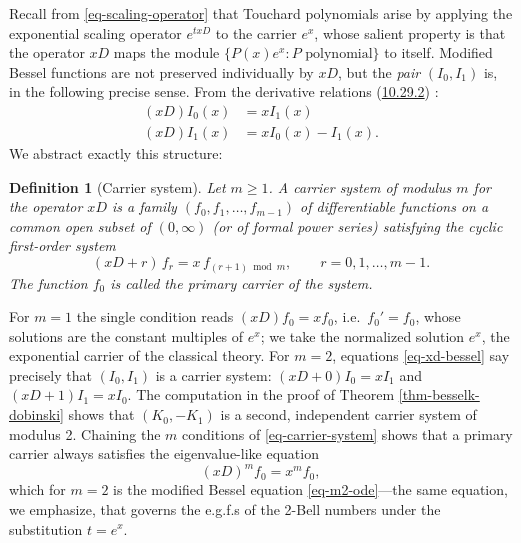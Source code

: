 \documentclass[a4paper]{amsart}
\numberwithin{equation}{section}
\newtheorem{definition}[theorem]{Definition}
\begin{document}
Recall from \eqref{eq-scaling-operator} that Touchard polynomials arise by applying the exponential scaling operator $e^{txD}$ to the carrier $e^x$, whose salient property is that the operator $xD$ maps the module $\{P(x)e^x : P \text{ polynomial}\}$ to itself. Modified Bessel functions are not preserved individually by $xD$, but the \emph{pair} $(I_0, I_1)$ is, in the following precise sense. From the derivative relations (\href{https://dlmf.nist.gov/10.29.E2}{10.29.2}) \cite{NIST:DLMF}:
\begin{equation}\label{eq-xd-bessel}
    \begin{aligned}
        (xD)I_0(x) &= x I_1(x) \\
        (xD)I_1(x) &= x I_0(x)-I_1(x).
    \end{aligned}
\end{equation}
We abstract exactly this structure:

\begin{definition}[Carrier system]\label{def-carrier-system}
Let $m \geq 1$. A \emph{carrier system of modulus $m$} for the operator $xD$ is a family $(f_0, f_1, \ldots, f_{m-1})$ of differentiable functions on a common open subset of $(0,\infty)$ (or of formal power series) satisfying the cyclic first-order system
\begin{equation}\label{eq-carrier-system}
(xD + r)\,f_r = x\,f_{(r+1) \bmod m}, \qquad r = 0, 1, \ldots, m-1.
\end{equation}
The function $f_0$ is called the \emph{primary carrier} of the system.
\end{definition}

For $m = 1$ the single condition reads $(xD)f_0 = x f_0$, i.e.\ $f_0' = f_0$, whose solutions are the constant multiples of $e^x$; we take the normalized solution $e^x$, the exponential carrier of the classical theory. For $m = 2$, equations \eqref{eq-xd-bessel} say precisely that $(I_0, I_1)$ is a carrier system: $(xD + 0)I_0 = xI_1$ and $(xD + 1)I_1 = xI_0$. The computation in the proof of Theorem \ref{thm-besselk-dobinski} shows that $(K_0, -K_1)$ is a second, independent carrier system of modulus 2. Chaining the $m$ conditions of \eqref{eq-carrier-system} shows that a primary carrier always satisfies the eigenvalue-like equation
\begin{equation}\label{eq-carrier-ode}
(xD)^m f_0 = x^m f_0,
\end{equation}
which for $m=2$ is the modified Bessel equation \eqref{eq-m2-ode}---the same equation, we emphasize, that governs the e.g.f.s of the 2-Bell numbers under the substitution $t = e^x$.
\end{document}
